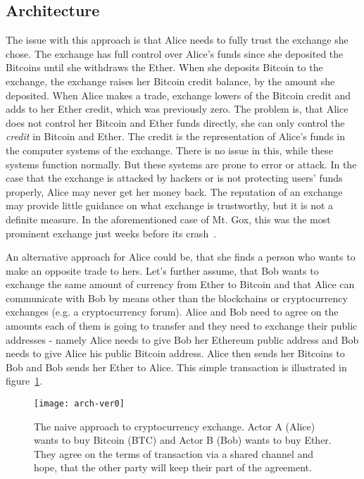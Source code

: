 \subsection{Architecture}
% 
The issue with this approach is that Alice needs to fully trust the exchange she chose. The exchange has full control over Alice's funds since she deposited the Bitcoins until she withdraws the Ether. When she deposits Bitcoin to the exchange, the exchange raises her Bitcoin credit balance, by the amount she deposited. When Alice makes a trade, exchange lowers of the Bitcoin credit and adds to her Ether credit, which was previously zero. The problem is, that Alice does not control her Bitcoin and Ether funds directly, she can only control the \textit{credit} in Bitcoin and Ether. The credit is the representation of Alice's funds in the computer systems of the exchange. There is no issue in this, while these systems function normally. But these systems are prone to error or attack. In the case that the exchange is attacked by hackers or is not protecting users' funds properly, Alice may never get her money back. The reputation of an exchange may provide little guidance on what exchange is trustworthy, but it is not a definite measure. In the aforementioned case of Mt. Gox, this was the most prominent exchange just weeks before its crash~\cite{Popper2014ApparentTimes}.

An alternative approach for Alice could be, that she finds a person who wants to make an opposite trade to hers. Let's further assume, that Bob wants to exchange the same amount of currency from Ether to Bitcoin and that Alice can communicate with Bob by means other than the blockchains or cryptocurrency exchanges (e.g. a cryptocurrency forum). Alice and Bob need to agree on the amounts each of them is going to transfer and they need to exchange their public addresses - namely Alice needs to give Bob her Ethereum public address and Bob needs to give Alice his public Bitcoin address. Alice then sends her Bitcoins to Bob and Bob sends her Ether to Alice. This simple transaction is illustrated in figure~\ref{fig:arch-ver0}.

\begin{figure}[ht]
    \centering
    \texttt{[image: arch-ver0]}
    \caption{The naive approach to cryptocurrency exchange. Actor A (Alice) wants to buy Bitcoin (BTC) and Actor B (Bob) wants to buy Ether. They agree on the terms of transaction via a shared channel and hope, that the other party will keep their part of the agreement.}
    \label{fig:arch-ver0}
\end{figure}

